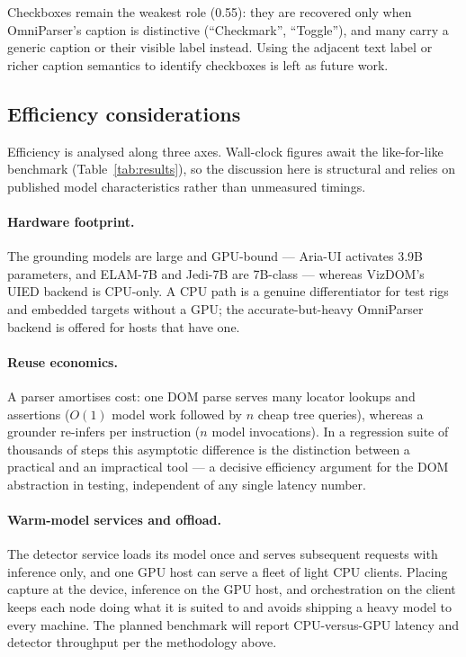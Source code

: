 \documentclass[11pt,a4paper]{article}
\begin{document}
Checkboxes remain the weakest role (0.55): they are recovered only when OmniParser's
caption is distinctive (``Checkmark'', ``Toggle''), and many carry a generic caption
or their visible label instead. Using the adjacent text label or richer caption
semantics to identify checkboxes is left as future work.

\subsection{Efficiency considerations}
Efficiency is analysed along three axes. Wall-clock figures await the like-for-like
benchmark (Table~\ref{tab:results}), so the discussion here is structural and relies
on published model characteristics rather than unmeasured timings.

\paragraph{Hardware footprint.} The grounding models are large and GPU-bound ---
Aria-UI activates 3.9B parameters, and ELAM-7B and Jedi-7B are 7B-class --- whereas
VizDOM's UIED backend is CPU-only. A CPU path is a genuine differentiator for test
rigs and embedded targets without a GPU; the accurate-but-heavy OmniParser backend
is offered for hosts that have one.

\paragraph{Reuse economics.} A parser amortises cost: one DOM parse serves many
locator lookups and assertions ($O(1)$ model work followed by $n$ cheap tree
queries), whereas a grounder re-infers per instruction ($n$ model invocations). In a
regression suite of thousands of steps this asymptotic difference is the distinction
between a practical and an impractical tool --- a decisive efficiency argument for
the DOM abstraction in testing, independent of any single latency number.

\paragraph{Warm-model services and offload.} The detector service loads its model
once and serves subsequent requests with inference only, and one GPU host can serve a
fleet of light CPU clients. Placing capture at the device, inference on the GPU host,
and orchestration on the client keeps each node doing what it is suited to and avoids
shipping a heavy model to every machine. The planned benchmark will report
CPU-versus-GPU latency and detector throughput per the methodology above.
\end{document}
